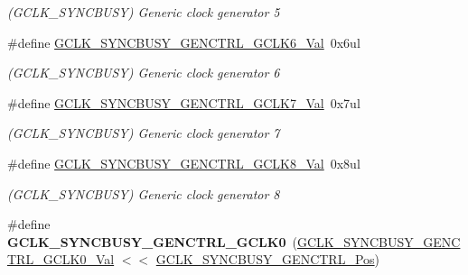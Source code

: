 \begin{DoxyCompactItemize}
\begin{DoxyCompactList}\small\item\em (G\+C\+L\+K\+\_\+\+S\+Y\+N\+C\+B\+U\+S\+Y) Generic clock generator 5 \end{DoxyCompactList}\item 
\hypertarget{group___s_a_m_l21___g_c_l_k_ga10a3a53a51e119577b8bc8b7b525eb7d}{}\#define \hyperlink{group___s_a_m_l21___g_c_l_k_ga10a3a53a51e119577b8bc8b7b525eb7d}{G\+C\+L\+K\+\_\+\+S\+Y\+N\+C\+B\+U\+S\+Y\+\_\+\+G\+E\+N\+C\+T\+R\+L\+\_\+\+G\+C\+L\+K6\+\_\+\+Val}~0x6ul\label{group___s_a_m_l21___g_c_l_k_ga10a3a53a51e119577b8bc8b7b525eb7d}

\begin{DoxyCompactList}\small\item\em (G\+C\+L\+K\+\_\+\+S\+Y\+N\+C\+B\+U\+S\+Y) Generic clock generator 6 \end{DoxyCompactList}\item 
\hypertarget{group___s_a_m_l21___g_c_l_k_gae905cf7ca8bc7ebd6a6537af7fb3ddfa}{}\#define \hyperlink{group___s_a_m_l21___g_c_l_k_gae905cf7ca8bc7ebd6a6537af7fb3ddfa}{G\+C\+L\+K\+\_\+\+S\+Y\+N\+C\+B\+U\+S\+Y\+\_\+\+G\+E\+N\+C\+T\+R\+L\+\_\+\+G\+C\+L\+K7\+\_\+\+Val}~0x7ul\label{group___s_a_m_l21___g_c_l_k_gae905cf7ca8bc7ebd6a6537af7fb3ddfa}

\begin{DoxyCompactList}\small\item\em (G\+C\+L\+K\+\_\+\+S\+Y\+N\+C\+B\+U\+S\+Y) Generic clock generator 7 \end{DoxyCompactList}\item 
\hypertarget{group___s_a_m_l21___g_c_l_k_ga4bc9fec20abf5638ab612ec6202e5681}{}\#define \hyperlink{group___s_a_m_l21___g_c_l_k_ga4bc9fec20abf5638ab612ec6202e5681}{G\+C\+L\+K\+\_\+\+S\+Y\+N\+C\+B\+U\+S\+Y\+\_\+\+G\+E\+N\+C\+T\+R\+L\+\_\+\+G\+C\+L\+K8\+\_\+\+Val}~0x8ul\label{group___s_a_m_l21___g_c_l_k_ga4bc9fec20abf5638ab612ec6202e5681}

\begin{DoxyCompactList}\small\item\em (G\+C\+L\+K\+\_\+\+S\+Y\+N\+C\+B\+U\+S\+Y) Generic clock generator 8 \end{DoxyCompactList}\item 
\hypertarget{group___s_a_m_l21___g_c_l_k_ga246f599beeb8e80c957ef4a434b52a01}{}\#define {\bfseries G\+C\+L\+K\+\_\+\+S\+Y\+N\+C\+B\+U\+S\+Y\+\_\+\+G\+E\+N\+C\+T\+R\+L\+\_\+\+G\+C\+L\+K0}~(\hyperlink{group___s_a_m_l21___g_c_l_k_ga062df74b14636eb428b8f0472abb27cb}{G\+C\+L\+K\+\_\+\+S\+Y\+N\+C\+B\+U\+S\+Y\+\_\+\+G\+E\+N\+C\+T\+R\+L\+\_\+\+G\+C\+L\+K0\+\_\+\+Val} $<$$<$ \hyperlink{group___s_a_m_l21___g_c_l_k_gaccbba8857cd7d67c4c0b526841298790}{G\+C\+L\+K\+\_\+\+S\+Y\+N\+C\+B\+U\+S\+Y\+\_\+\+G\+E\+N\+C\+T\+R\+L\+\_\+\+Pos})\label{group___s_a_m_l21___g_c_l_k_ga246f599beeb8e80c957ef4a434b52a01}


\end{DoxyCompactItemize}
